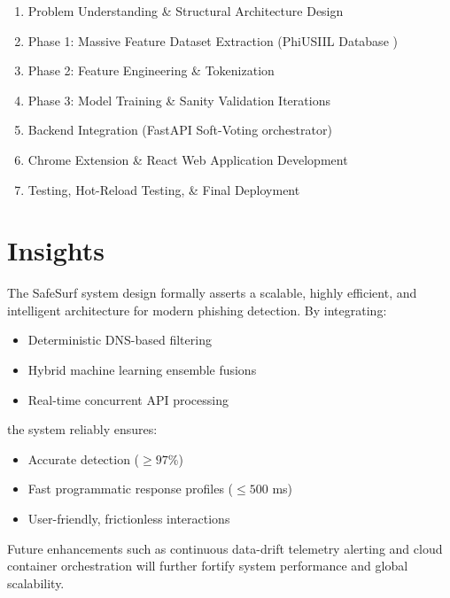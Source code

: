 \begin{enumerate}
    \item Problem Understanding \& Structural Architecture Design
    \item Phase 1: Massive Feature Dataset Extraction (PhiUSIIL Database \cite{ref5})
    \item Phase 2: Feature Engineering \& Tokenization
    \item Phase 3: Model Training \& Sanity Validation Iterations
    \item Backend Integration (FastAPI Soft-Voting orchestrator)
    \item Chrome Extension \& React Web Application Development
    \item Testing, Hot-Reload Testing, \& Final Deployment
\end{enumerate}

\section{Insights}
\noindent
The SafeSurf system design formally asserts a scalable, highly efficient, and intelligent architecture for modern phishing detection.
\noindent
By integrating:

\begin{itemize}
    \item Deterministic DNS-based filtering
    \item Hybrid machine learning ensemble fusions
    \item Real-time concurrent API processing
\end{itemize}
\noindent
the system reliably ensures:

\begin{itemize}
    \item Accurate detection ($\geq 97\%$)
    \item Fast programmatic response profiles ($\leq 500$ ms)
    \item User-friendly, frictionless interactions
\end{itemize}
\noindent
Future enhancements such as continuous data-drift telemetry alerting and cloud container orchestration \cite{ref14} will further fortify system performance and global scalability.

